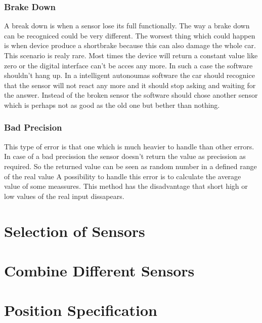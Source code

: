 \subsubsection{Brake Down}
A break down is when a sensor lose its full functionally.
The way a brake down can be recogniced could be very different.
The worsest thing which could happen is when device produce a shortbrake because this can also damage the whole car.
This scenario is realy rare.
Most times the device will return a constant value like zero or the digital interface can't be acces any more.
In such a case the software shouldn't hang up.
In a intelligent autonoumas software the car should recognice that the sensor will not react any more and it should stop asking and waiting for the answer.
Instead of the broken sensor the software should chose another sensor which is perhaps not as good as the old one but bether than nothing.


\subsubsection{Bad Precision}
This type of error is that one which is much heavier to handle than other errors.
In case of a bad precission the sensor doesn't return the value as precission as required.
So the returned value can be seen as random number in a defined range of the real value
A possibility to handle this error is to calculate the average value of some meassures.
This method has the disadvantage that short high or low values of the real input dissapears.


\section{Selection of Sensors}



\section{Combine Different Sensors}


\section{Position Specification}
